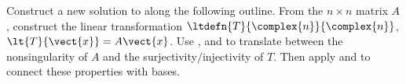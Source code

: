 Construct a new solution to  along the following outline.  From the $n\times n$ matrix $A$, construct the linear transformation $\ltdefn{T}{\complex{n}}{\complex{n}}$, $\lt{T}{\vect{x}}=A\vect{x}$.  Use ,  and  to translate between the nonsingularity of $A$ and the surjectivity/injectivity of $T$.  Then apply  and   to connect these properties with bases.